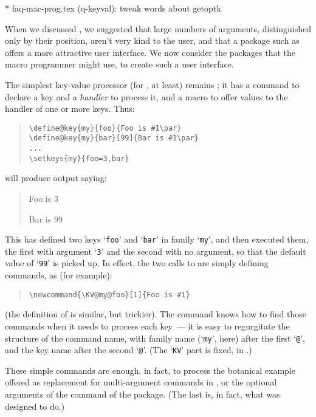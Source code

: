         * faq-mac-prog.tex (q-keyval): tweak words about getoptk


When we discussed %
, we
suggested that large numbers of arguments, distinguished only by their
position, aren't very kind to the user, and that a package such as
 offers a more attractive user interface.  We now
consider the packages that the macro programmer might use, to create
such a user interface.

The simplest key-value processor (for \latex{}, at least) remains
; it has a command  to declare a key
and a \emph{handler} to process it, and a macro  to offer
values to the handler of one or more keys.  Thus:
\begin{quote}
\begin{verbatim}
\define@key{my}{foo}{Foo is #1\par}
\define@key{my}{bar}[99]{Bar is #1\par}
...
\setkeys{my}{foo=3,bar}
\end{verbatim}
\end{quote}
will produce output saying:
\begin{quote}
  Foo is 3\par{}
  Bar is 99
\end{quote}
This has defined two keys `\texttt{foo}' and `\texttt{bar}' in family
`\texttt{my}', and then executed them, the first with argument
`\texttt{3}' and the second with no argument, so that the default
value of `\texttt{99}' is picked up.  In effect, the two calls to
 are simply defining commands, as (for example):
\begin{quote}
\begin{verbatim}
\newcommand{\KV@my@foo}[1]{Foo is #1}
\end{verbatim}
\end{quote}
(the definition of  is similar, but trickier).  The
command  knows how to find those commands when it needs to
process each key~--- it is easy to regurgitate the structure of the
command name, with family name (`\texttt{my}', here) after the first
`\texttt{@}', and the key name after the second `\texttt{@}'.  (The
`\texttt{KV}' part is fixed, in .)

These simple commands are enough, in fact, to process the botanical
example offered as replacement for multi-argument commands in %
, or the
optional arguments of the  command of the
 package.  (The last is, in fact, what
 was designed to do.)

